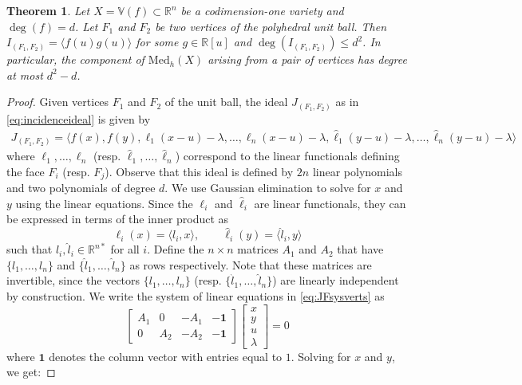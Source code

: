 \documentclass{article}
\newtheorem{theorem}{Theorem}
\numberwithin{theorem}{section}
\theoremstyle{definition}
\theoremstyle{example_contd}
\newcommand{\RR}{\mathbb{R}}
\newcommand{\Rd}{\mathbb{R}^{n*}}
\newcommand{\med}{\mathrm{Med}_h}
\newcommand{\IF}{I_{(F_1,F_2)}}
\newcommand{\JF}{J_{(F_1,F_2)}}
\newcommand{\V}{{\mathbb{V}}}
\begin{document}
\begin{theorem}\label{thm:vertex_vertex}
	Let $X=\V(f)\subset \RR^n$ be a codimension-one variety and $\deg(f) = d$. Let $F_1$ and $F_2$ be two vertices of the polyhedral unit ball. Then $\IF=\langle f(u)g(u) \rangle$ for some $g\in \RR[u]$ and $\deg(\IF) \leq d^2$. 
    In particular, the component of $\med(X)$ arising from a pair of vertices has degree at most $d^2 - d$.
\end{theorem}


\begin{proof}
	Given vertices $F_1$ and $F_2$ of the unit ball, the ideal $\JF$ as in \eqref{eq:incidenceideal} is given by%
	\begin{align}\label{eq:JFsysverts}
		\JF = \langle f(x), f(y), \ell_1(x-u) - \lambda,\ldots, \ell_n(x - u) - \lambda, \hat{\ell}_1(y-u) - \lambda,\ldots, \hat{\ell}_n(y - u) - \lambda \rangle 
	\end{align}
	where $\ell_1,\ldots,\ell_n$ (resp. $\hat{\ell}_1,\ldots,\hat{\ell}_n$) correspond to the linear functionals defining the face $F_i$ (resp. $F_j$). 
	Observe that this ideal is defined by $2n$ linear polynomials and two polynomials of degree $d$. We use Gaussian elimination to solve for $x$ and $y$ using the linear equations. Since the $\ell_i$ and $\hat{\ell}_i$ are linear functionals, they can be expressed in terms of the inner product as 
	\[\ell_i(x)=\langle l_i,x \rangle, \qquad \hat{\ell}_i(y)=\langle \hat{l}_i,y \rangle  \]
	such that $l_i, \hat{l}_i \in \Rd$ for all $i$.
	Define the $n\times n$ matrices $A_1$ and $A_2$ that have $\{l_1,\dots ,l_n\}$  and $ \{ \hat{l}_1,\dots,\hat{l}_n\} $ as rows respectively. Note that these matrices are invertible, since the vectors $\{l_1,\dots ,l_n\}$ (resp. $ \{ \hat{l}_1,\dots,\hat{l}_n\} $) are linearly independent by construction. We write the system of linear equations in \eqref{eq:JFsysverts} as
	\[\begin{bmatrix}
		A_1 & 0 & -A_1 & - \mathbf{1} \\
		0 & A_2 & -A_2 & -\mathbf{1}
	\end{bmatrix} 
	\begin{bmatrix}
		x \\
		y \\
		u \\
		\lambda 
	\end{bmatrix} = 0
	\]
	where $\mathbf{1}$ denotes the column vector with entries equal to $1$. Solving for $x$ and $y$, we get:

\end{proof}
\end{document}
